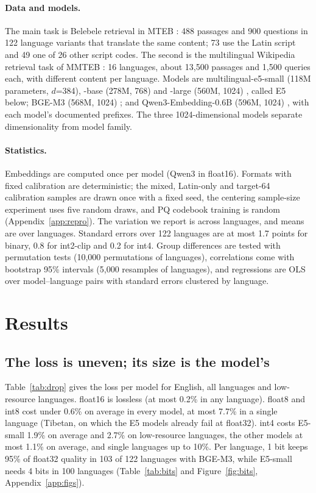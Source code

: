 \documentclass[11pt]{article}
\begin{document}
\paragraph{Data and models.} The main task is Belebele retrieval in MTEB \citep{bandarkar2024belebele,enevoldsen2025mmteb}: 488 passages and 900 questions in 122 language variants that translate the same content; 73 use the Latin script and 49 one of 26 other script codes. The second is the multilingual Wikipedia retrieval task of MMTEB \citep{enevoldsen2025mmteb}: 16 languages, about 13{,}500 passages and 1{,}500 queries each, with different content per language. Models are multilingual-e5-small (118M parameters, $d$=384), -base (278M, 768) and -large (560M, 1024) \citep{wang2024me5}, called E5 below; BGE-M3 (568M, 1024) \citep{chen2024bgem3}; and Qwen3-Embedding-0.6B (596M, 1024) \citep{zhang2025qwen3emb}, with each model's documented prefixes. The three 1024-dimensional models separate dimensionality from model family.

\paragraph{Statistics.} Embeddings are computed once per model (Qwen3 in float16). Formats with fixed calibration are deterministic; the mixed, Latin-only and target-64 calibration samples are drawn once with a fixed seed, the centering sample-size experiment uses five random draws, and PQ codebook training is random (Appendix~\ref{app:repro}). The variation we report is across languages, and means are over languages. Standard errors over 122 languages are at most 1.7 points for binary, 0.8 for int2-clip and 0.2 for int4. Group differences are tested with permutation tests (10{,}000 permutations of languages), correlations come with bootstrap 95\% intervals (5{,}000 resamples of languages), and regressions are OLS over model--language pairs with standard errors clustered by language.

\section{Results}
\subsection{The loss is uneven; its size is the model's}\label{sec:uneven}

Table~\ref{tab:drop} gives the loss per model for English, all languages and low-resource languages. float16 is lossless (at most 0.2\% in any language). float8 and int8 cost under 0.6\% on average in every model, at most 7.7\% in a single language (Tibetan, on which the E5 models already fail at float32). int4 costs E5-small 1.9\% on average and 2.7\% on low-resource languages, the other models at most 1.1\% on average, and single languages up to 10\%. Per language, 1 bit keeps 95\% of float32 quality in 103 of 122 languages with BGE-M3, while E5-small needs 4 bits in 100 languages (Table~\ref{tab:bits} and Figure~\ref{fig:bits}, Appendix~\ref{app:figs}).
\end{document}
